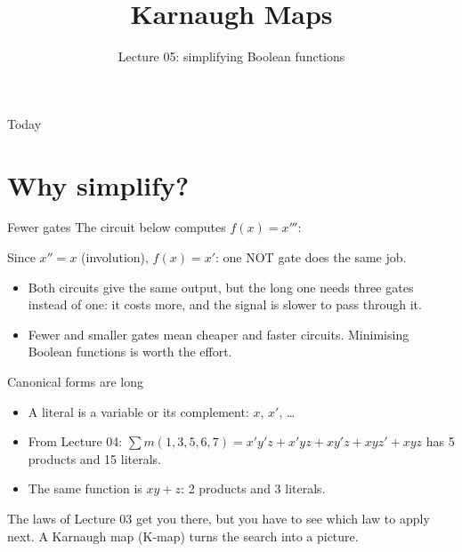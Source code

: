\documentclass[10pt]{wosm-slides}
\title[Lecture 05 \textperiodcentered\ Karnaugh Maps]{Karnaugh Maps}
\subtitle{Lecture 05: simplifying Boolean functions}
\begin{document}
\maketitle

\begin{frame}{Today}
  \tableofcontents
\end{frame}

\section{Why simplify?}

\begin{frame}{Fewer gates}
  The circuit below computes $f(x) = x'''$:
  \begin{center}
  \end{center}

  Since $x'' = x$ (involution), $f(x) = x'$: one NOT gate does the same job.

  \medskip
  \begin{itemize}
    \item Both circuits give the same output, but the long one needs three gates
      instead of one: it costs more, and the signal is slower to pass through it.
    \item Fewer and smaller gates mean cheaper and faster circuits. Minimising
      Boolean functions is worth the effort.
  \end{itemize}
\end{frame}

\begin{frame}{Canonical forms are long}
  \begin{itemize}
    \item A \alert{literal} is a variable or its complement: $x$, $x'$, \dots
    \item From Lecture 04:
      $\sum m(1, 3, 5, 6, 7) = x'y'z + x'yz + xy'z + xyz' + xyz$ has 5 products and
      15 literals.
    \item The same function is $xy + z$: 2 products and 3 literals.
  \end{itemize}

  \medskip
  The laws of Lecture 03 get you there, but you have to see which law to apply
  next. A \alert{Karnaugh map} (K-map) turns the search into a picture.

  \medskip
\end{frame}
\end{document}
